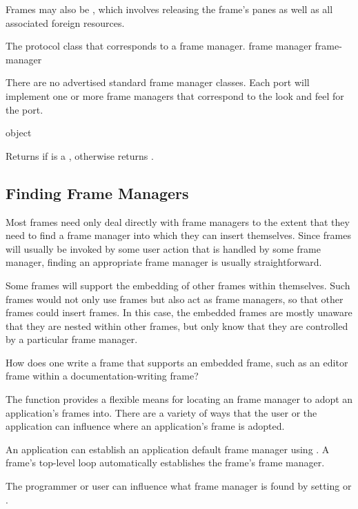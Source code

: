 Frames may also be , which involves releasing the frame's
panes as well as all associated foreign resources.


The protocol class that corresponds to a frame manager.
 {frame manager} {frame-manager}

There are no advertised standard frame manager classes.  Each port will
implement one or more frame managers that correspond to the look and feel for
the port.

 {object}

Returns  if  is a , otherwise returns
.


\subsection {Finding Frame Managers}

Most frames need only deal directly with frame managers to the extent that they
need to find a frame manager into which they can insert themselves.  Since
frames will usually be invoked by some user action that is handled by some frame
manager, finding an appropriate frame manager is usually straightforward.

Some frames will support the embedding of other frames within themselves.  Such
frames would not only use frames but also act as frame managers, so that other
frames could insert frames.  In this case, the embedded frames are mostly
unaware that they are nested within other frames, but only know that they are
controlled by a particular frame manager.  

 {How does one write a frame that supports an embedded frame, such
as an editor frame within a documentation-writing frame?}

The  function provides a flexible means for locating an
frame manager to adopt an application's frames into.  There are a variety of
ways that the user or the application can influence where an application's frame
is adopted.

An application can establish an application default frame manager using
.  A frame's top-level loop automatically establishes the
frame's frame manager.

The programmer or user can influence what frame manager is found by setting
 or .

